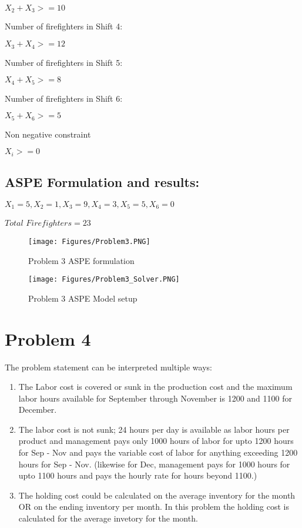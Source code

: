 \documentclass[]{article}
\begin{document}
\(X_{2} + X_{3} >= 10\)

Number of firefighters in Shift 4:

\(X_{3} + X_{4} >= 12\)

Number of firefighters in Shift 5:

\(X_{4} + X_{5} >= 8\)

Number of firefighters in Shift 6:

\(X_{5} + X_{6} >= 5\)

Non negative constraint

\(X_{i} >= 0\)

\subsection{ASPE Formulation and
results:}\label{aspe-formulation-and-results-2}

\(X_{1} = 5, X_{2} = 1, X_{3} = 9, X_{4} = 3, X_{5} = 5, X_{6} = 0\)

\(Total\) \(Firefighters = 23\)

\begin{figure}
\centering
\texttt{[image: Figures/Problem3.PNG]}
\caption{Problem 3 ASPE formulation}
\end{figure}

\begin{figure}
\centering
\texttt{[image: Figures/Problem3\_Solver.PNG]}
\caption{Problem 3 ASPE Model setup}
\end{figure}

\pagebreak

\section{Problem 4}\label{problem-4}

The problem statement can be interpreted multiple ways:

\begin{enumerate}
\def\labelenumi{\arabic{enumi}.}
\item
  The Labor cost is covered or sunk in the production cost and the
  maximum labor hours available for September through November is 1200
  and 1100 for December.
\item
  The labor cost is not sunk; 24 hours per day is available as labor
  hours per product and management pays only 1000 hours of labor for
  upto 1200 hours for Sep - Nov and pays the variable cost of labor for
  anything exceeding 1200 hours for Sep - Nov. (likewise for Dec,
  management pays for 1000 hours for upto 1100 hours and pays the hourly
  rate for hours beyond 1100.)
\item
  The holding cost could be calculated on the average inventory for the
  month OR on the ending inventory per month. In this problem the
  holding cost is calculated for the average invetory for the month.
\end{enumerate}
\end{document}

